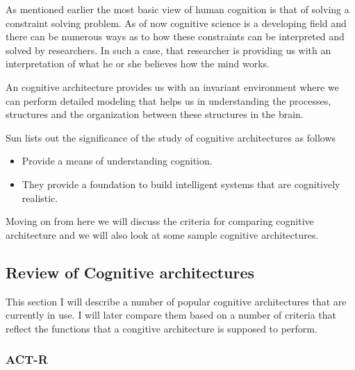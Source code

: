 As mentioned earlier the most basic view of human cognition is that of
solving a constraint solving problem\cite{Newell:1990aa}. As of now
cognitive science is a developing field and there can be numerous ways
as to how these constraints can be interpreted and solved by
researchers. In such a case, that researcher is providing us with an
interpretation of what he or she believes how the mind works.

An cognitive architecture provides us with an invariant environment
where we can perform detailed modeling that helps us in understanding
the processes, structures and the organization between these
structures in the brain\cite{journals/jetai/Sun07}.
 

Sun\cite{journals/jetai/Sun07} lists out the significance of the study
of cognitive architectures as follows
\begin{itemize}
\item Provide a means of understanding cognition.
\item They provide a foundation to build intelligent systems that are
  cognitively realistic.
\end{itemize}

Moving on from here we will discuss the criteria for comparing
cognitive architecture and we will also look at some sample cognitive
architectures.

\subsection{Review of Cognitive architectures}

This section I will describe a number of popular cognitive
architectures that are currently in use. I will later compare them
based on a number of criteria that reflect the functions that a
congitive architecture is supposed to perform.



\subsubsection{ACT-R}


